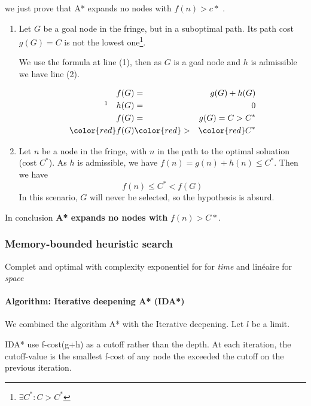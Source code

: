 we just prove that A* expands no nodes with $f(n) > c*$ .
\begin{enumerate}

    \item Let  $G$ be  a goal node  in the fringe,  but in  a suboptimal
    path. Its path cost $g(G)=C$ is not the lowest one\footnote{$\exists
    C^* : C  > C^*$}. 
    
    We use the  formula at line (1), then as  $G$ is a
    goal node and $h$ is admissible we have line (2).

        \begin{eqnarray}
            f(G) &=& g(G) + h(G)\\
            \footnotemark\quad h(G) &=& 0 \\
            f(G) &=& g(G) = C > C^*\\
            \color{red}f(G) &\color{red}>&\color{red} C^*
        \end{eqnarray}

    \item Let $n$ be a node in the fringe, with $n$ in the path to the optimal soluation (cost $C^*$). As $h$ is admissible, we have $f(n) = g(n) + h(n) \leq C^*$. Then we have
    $$f(n) \leq C^* < f(G)$$
    In this scenario, $G$ will never be selected, so the hypothesis is absurd. 
\end{enumerate}

In conclusion \textbf{A* expands no nodes with} $f(n) > C*$.

\subsubsection{Memory-bounded heuristic search}

Complet and  optimal with  complexity exponentiel for  for \textit{time}
and linéaire for \textit{space} 

\paragraph{Algorithm: Iterative deepening A* (IDA*)}

We combined the algorithm A* with the Iterative deepening. Let $l$ be a limit.

IDA* use f-cost(g+h) as a cutoff rather than the depth. At each iteration, 
the cutoff-value is the smallest f-cost of any node the exceeded the cutoff on 
the previous iteration.\\

